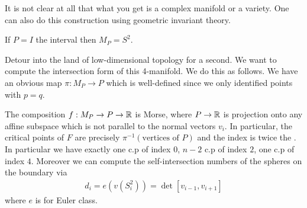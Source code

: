 \documentclass[12pt]{article}
\begin{document}
It is not clear at all that what you get is a complex manifold or a variety. One can also do this construction using geometric invariant theory.

\begin{example}
    If $P = I$ the interval then $M_P = S^2$.
\end{example}

Detour into the land of low-dimensional topology for a second. We want to compute the intersection form of this 4-manifold.  We do this as follows. We have an obvious map $\pi:M_P\to P$ which is well-defined since we only identified points with $p = q$.

\begin{theorem}
    The composition $f:M_P\to P\to\mathbb{R}$ is Morse, where $P\to \mathbb{R}$ is projection onto any affine subspace which is not parallel to the normal vectors $v_i$. In particular, the critical points of $F$ are precisely $\pi^{-1}(\text{vertices of $P$})$ and the index is twice the . In particular we have exactly one c.p of index $0$, $n-2$ c.p of index $2$, one c.p of index $4$. Moreover we can compute the self-intersection numbers of the spheres on the boundary via \begin{align*}
        d_i = e(v(S^2_i)) = \det[v_{i-1},v_{i+1}]
    \end{align*} where $e$ is for Euler class. 
\end{theorem}
\end{document}
